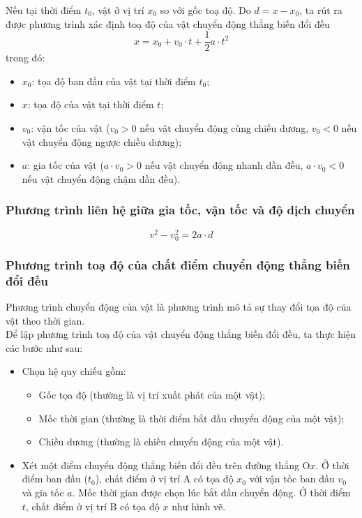 \begin{tomtat}
\begin{center}
	\label{fig:9.4}
\end{center}
Nếu tại thời điểm $t_0$, vật ở vị trí $x_0$ so với gốc toạ độ. Do $d=x-x_0$, ta rút ra được phương trình xác định toạ độ của vật chuyển động thẳng biến đổi đều
$$x=x_0+v_0\cdot t+\dfrac{1}{2}a\cdot t^2$$
trong đó:
\begin{itemize}[label=$\circ$]
	\item $x_0$: tọa độ ban đầu của vật tại thời điểm $t_0$;
	\item $x$: tọa độ của vật tại thời điểm $t$;
	\item $v_0$: vận tốc của vật ($v_0>0$ nếu vật chuyển động cùng chiều dương, $v_0<0$ nếu vật chuyển động ngược chiều dương);
	\item $a$: gia tốc của vật ($a\cdot v_0>0$ nếu vật chuyển động nhanh dần đều, $a\cdot v_0<0$ nếu vật chuyển động chậm dần đều).
\end{itemize}
\subsubsection{Phương trình liên hệ giữa gia tốc, vận tốc và độ dịch chuyển}
$$v^2-v^2_0=2a\cdot d$$

\subsubsection{Phương trình toạ độ của chất điểm chuyển động thẳng biến đổi đều}
Phương trình chuyển động của vật là phương trình mô tả sự thay đổi tọa độ của vật theo thời gian. \\
Để lập phương trình toạ độ của vật chuyển động thẳng biến đổi đều, ta thực hiện các bước như sau:
\begin{itemize}
	\item Chọn hệ quy chiếu gồm:
	\begin{itemize}
		\item Gốc tọa độ (thường là vị trí xuất phát của một vật);
		\item Mốc thời gian (thường là thời điểm bắt đầu chuyển động của một vật);
		\item Chiều dương (thường là chiều chuyển động của một vật).
	\end{itemize}
	\item Xét một điểm chuyển động thẳng biến đổi đều trên đường thẳng O$x$. Ở thời điểm ban đầu ($t_0$), chất điểm ở vị trí A có tọa độ $x_{0}$  với vận tốc ban đầu $v_0$ và gia tốc $a$. Mốc thời gian được chọn lúc bắt đầu chuyển động. Ở thời điểm $t$, chất điểm ở vị trí B có tọa độ $x$ như hình vẽ.  	
	\begin{center}
\end{center}
\end{itemize}
\end{tomtat}
